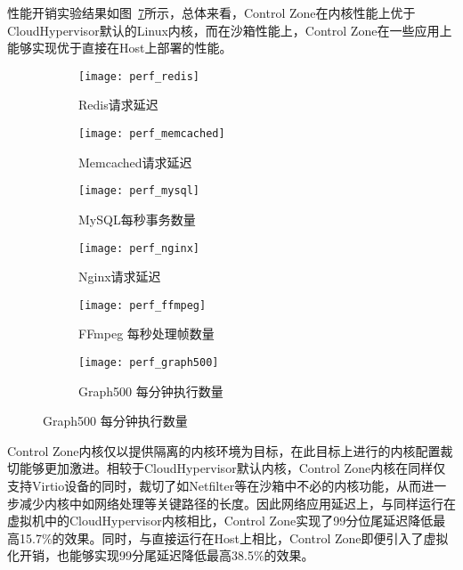 性能开销实验结果如图~\ref{fig:perf_app}所示，总体来看，Control Zone在内核性能上优于CloudHypervisor默认的Linux内核，而在沙箱性能上，Control Zone在一些应用上能够实现优于直接在Host上部署的性能。

\begin{figure}[H]
    \centering
    \begin{subfigure}[b]{0.32\textwidth}
        \texttt{[image: perf\_redis]}
        \caption{\quad Redis请求延迟}
        \label{fig:perf_redis}
    \end{subfigure}
    \begin{subfigure}[b]{0.32\textwidth}
        \texttt{[image: perf\_memcached]}
        \caption{\quad Memcached请求延迟}
        \label{fig:perf_memcached}
    \end{subfigure}
    \begin{subfigure}[b]{0.32\textwidth}
        \texttt{[image: perf\_mysql]}
        \caption{\quad MySQL每秒事务数量}
        \label{fig:perf_mysql}
    \end{subfigure}
    \begin{subfigure}[b]{0.32\textwidth}
        \texttt{[image: perf\_nginx]}
        \caption{\quad Nginx请求延迟}
        \label{fig:perf_nginx}
    \end{subfigure}
    \begin{subfigure}[b]{0.32\textwidth}
        \texttt{[image: perf\_ffmpeg]}
        \caption{\quad FFmpeg 每秒处理帧数量}
        \label{fig:perf_ffmpeg}
    \end{subfigure}
    \begin{subfigure}[b]{0.32\textwidth}
        \texttt{[image: perf\_graph500]}
        \caption{\quad Graph500 每分钟执行数量}
        \label{fig:perf_graph500}
    \end{subfigure}
\label{fig:perf_app}
\end{figure}

Control Zone内核仅以提供隔离的内核环境为目标，在此目标上进行的内核配置裁切能够更加激进。相较于CloudHypervisor默认内核，Control Zone内核在同样仅支持Virtio设备的同时，裁切了如Netfilter等在沙箱中不必的内核功能，从而进一步减少内核中如网络处理等关键路径的长度。因此网络应用延迟上，与同样运行在虚拟机中的CloudHypervisor内核相比，Control Zone实现了99分位尾延迟降低最高15.7\%的效果。同时，与直接运行在Host上相比，Control Zone即便引入了虚拟化开销，也能够实现99分尾延迟降低最高38.5\%的效果。

